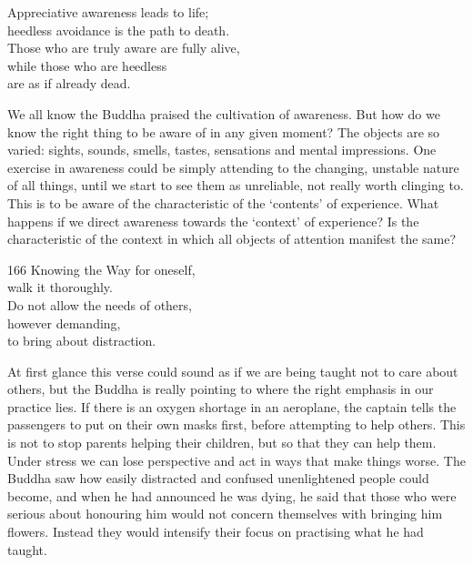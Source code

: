 

\begin{dhpVerse}{21}
\label{dhp-21}
Appreciative awareness leads to life;\\
heedless avoidance is the path to death.\\
Those who are truly aware are fully alive,\\
while those who are heedless\\
are as if already dead.
\end{dhpVerse}

\begin{dhpRefl}
  We all know the Buddha praised the cultivation of awareness. But how do we
  know the right thing to be aware of in any given moment? The objects are so
  varied: sights, sounds, smells, tastes, sensations and mental impressions. One
  exercise in awareness could be simply attending to the changing, unstable
  nature of all things, until we start to see them as unreliable, not really
  worth clinging to. This is to be aware of the characteristic of the ‘contents’
  of experience. What happens if we direct awareness towards the ‘context’ of
  experience? Is the characteristic of the context in which all objects of
  attention manifest the same?
\end{dhpRefl}


\begin{dhpVerse}{166}
\label{dhp-166}
Knowing the Way for oneself,\\
walk it thoroughly.\\
Do not allow the needs of others,\\
however demanding,\\
to bring about distraction.
\end{dhpVerse}

\begin{dhpRefl}
  At first glance this verse could sound as if we are being taught not to care
  about others, but the Buddha is really pointing to where the right emphasis in
  our practice lies. If there is an oxygen shortage in an aeroplane, the captain
  tells the passengers to put on their own masks first, before attempting to
  help others. This is not to stop parents helping their children, but so that
  they can help them. Under stress we can lose perspective and act in ways that
  make things worse. The Buddha saw how easily distracted and confused
  unenlightened people could become, and when he had announced he was dying, he
  said that those who were serious about honouring him would not concern
  themselves with bringing him flowers. Instead they would intensify their focus
  on practising what he had taught.
\end{dhpRefl}


